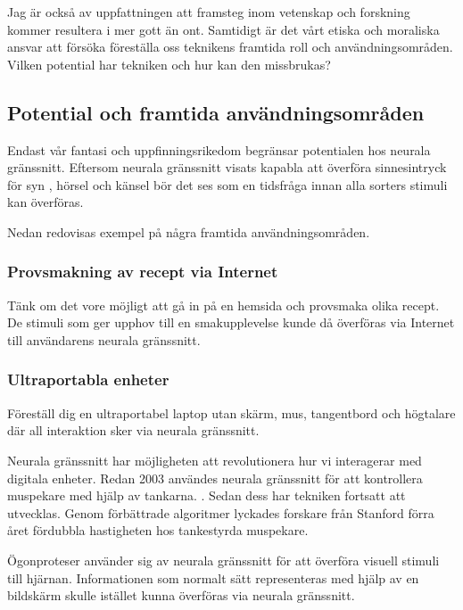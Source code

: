 \documentclass[12pt, a4paper]{article}
\begin{document}
Jag är också av uppfattningen att framsteg inom vetenskap och forskning kommer
resultera i mer gott än ont. Samtidigt är det vårt etiska och moraliska ansvar
att försöka föreställa oss teknikens framtida roll och användningsområden.
Vilken potential har tekniken och hur kan den missbrukas?


\subsection{Potential och framtida användningsområden}

Endast vår fantasi och uppfinningsrikedom begränsar potentialen hos neurala
gränssnitt. Eftersom neurala gränssnitt visats kapabla att överföra
sinnesintryck för syn \cite{sight1,sight2}, hörsel \cite{sound} och känsel
\cite{touch} bör det ses som en tidsfråga innan alla sorters stimuli kan
överföras.

Nedan redovisas exempel på några framtida användningsområden.

\subsubsection{Provsmakning av recept via Internet}

Tänk om det vore möjligt att gå in på en hemsida och provsmaka olika recept. De
stimuli som ger upphov till en smakupplevelse kunde då överföras via Internet
till användarens neurala gränssnitt.

\subsubsection{Ultraportabla enheter}

Föreställ dig en ultraportabel laptop utan skärm, mus, tangentbord och högtalare
där all interaktion sker via neurala gränssnitt.

Neurala gränssnitt har möjligheten att revolutionera hur vi interagerar med
digitala enheter. Redan 2003 användes neurala gränssnitt för att kontrollera
muspekare med hjälp av tankarna. \cite{cursor1}. Sedan dess har tekniken
fortsatt att utvecklas. Genom förbättrade algoritmer lyckades forskare från
Stanford förra året fördubbla hastigheten hos tankestyrda muspekare.
\cite{fast_cursor}

Ögonproteser använder sig av neurala gränssnitt för att överföra visuell stimuli
till hjärnan. \cite{prosthetic_operation} Informationen som normalt sätt
representeras med hjälp av en bildskärm skulle istället kunna överföras via
neurala gränssnitt.
\end{document}
